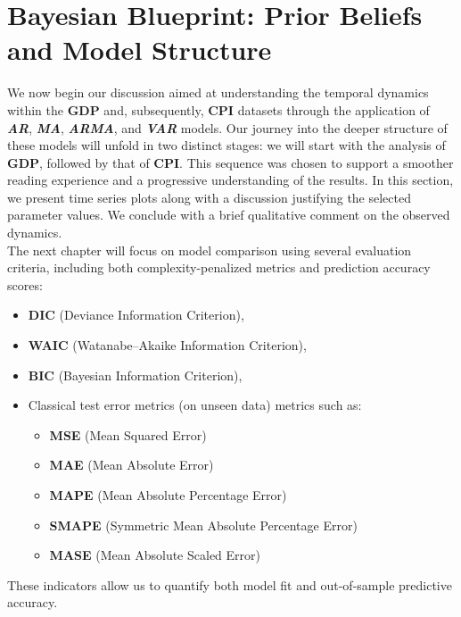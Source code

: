 \documentclass{Configuration_Files/PoliMi3i_thesis}
\begin{document}
\chapter{Bayesian Blueprint: Prior Beliefs and Model Structure}
We now begin our discussion aimed at understanding the temporal dynamics within the \textbf{GDP} and, subsequently, \textbf{CPI} datasets through the application of \textbf{\textit{AR}}, \textbf{\textit{MA}}, \textbf{\textit{ARMA}}, and \textbf{\textit{VAR}} models. Our journey into the deeper structure of these models will unfold in two distinct stages: we will start with the analysis of \textbf{GDP}, followed by that of \textbf{CPI}. This sequence was chosen to support a smoother reading experience and a progressive understanding of the results.
In this section, we present time series plots along with a discussion justifying the selected parameter values. We conclude with a brief qualitative comment on the observed dynamics.\\

The next chapter will focus on model comparison using several evaluation criteria, including both complexity-penalized metrics and prediction accuracy scores:
\begin{itemize}
    \item \textbf{DIC} (Deviance Information Criterion),
    \item \textbf{WAIC} (Watanabe–Akaike Information Criterion),
    \item \textbf{BIC} (Bayesian Information Criterion),
    \item Classical test error metrics (on unseen data) metrics such as:
    \begin{itemize}
  \item \textbf{MSE} (Mean Squared Error)
  \item \textbf{MAE} (Mean Absolute Error)
  \item \textbf{MAPE} (Mean Absolute Percentage Error)
  \item \textbf{SMAPE} (Symmetric Mean Absolute Percentage Error)
  \item \textbf{MASE} (Mean Absolute Scaled Error)
    \end{itemize}
\end{itemize}
These indicators allow us to quantify both model fit and out-of-sample predictive accuracy.
\end{document}
